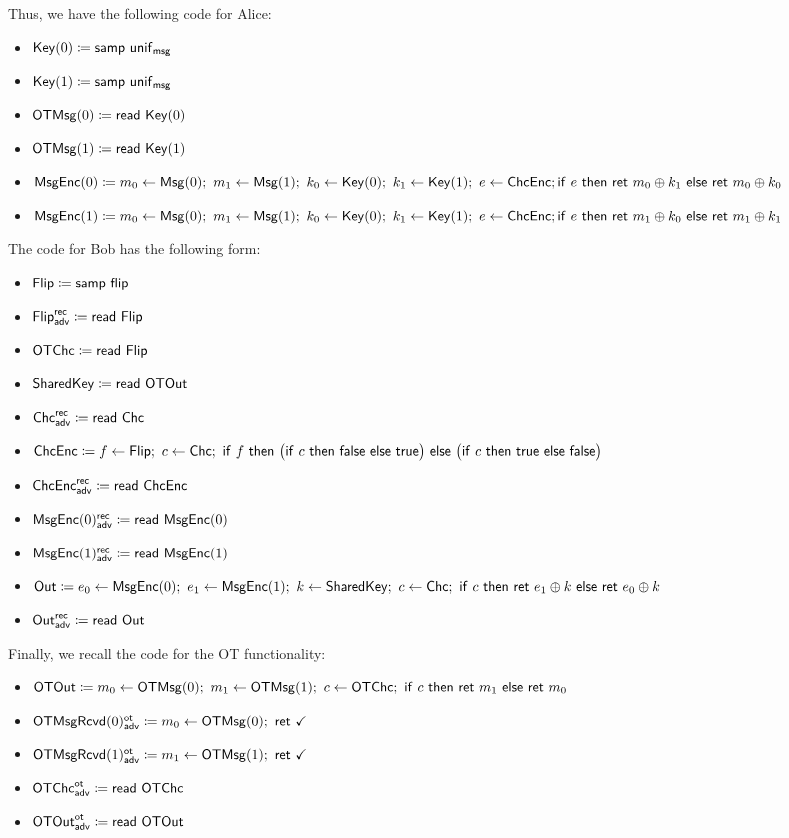 Thus, we have the following code for Alice:
\begin{itemize}
\item $\mathsf{Key}(0) \coloneqq \mathsf{samp} \ \mathsf{unif}_{\mathsf{msg}}$
\item $\mathsf{Key}(1) \coloneqq \mathsf{samp} \ \mathsf{unif}_{\mathsf{msg}}$
\item $\mathsf{OTMsg}(0) \coloneqq \mathsf{read} \ \mathsf{Key}(0)$
\item $\mathsf{OTMsg}(1) \coloneqq \mathsf{read} \ \mathsf{Key}(1)$
\item $\mathsf{MsgEnc}(0) \coloneqq m_0 \leftarrow \mathsf{Msg}(0); \ m_1 \leftarrow \mathsf{Msg}(1); \ k_0 \leftarrow \mathsf{Key}(0); \ k_1 \leftarrow \mathsf{Key}(1); \ e \leftarrow \mathsf{ChcEnc}; \\ \mathsf{if} \ e \ \mathsf{then} \ \mathsf{ret} \ m_0 \oplus k_1 \ \mathsf{else} \ \mathsf{ret} \ m_0 \oplus k_0$
\item $\mathsf{MsgEnc}(1) \coloneqq m_0 \leftarrow \mathsf{Msg}(0); \ m_1 \leftarrow \mathsf{Msg}(1); \ k_0 \leftarrow \mathsf{Key}(0); \ k_1 \leftarrow \mathsf{Key}(1); \ e \leftarrow \mathsf{ChcEnc}; \\ \mathsf{if} \ e \ \mathsf{then} \ \mathsf{ret} \ m_1 \oplus k_0 \ \mathsf{else} \ \mathsf{ret} \ m_1 \oplus k_1$
\end{itemize}
The code for Bob has the following form:
\begin{itemize}
\item $\mathsf{Flip} \coloneqq \mathsf{samp} \ \mathsf{flip}$
\item {\color{blue} $\mathsf{Flip}^{\mathsf{rec}}_{\mathsf{adv}} \coloneqq \mathsf{read} \ \mathsf{Flip}$}
\item $\mathsf{OTChc} \coloneqq \mathsf{read} \ \mathsf{Flip}$
\item $\mathsf{SharedKey} \coloneqq \mathsf{read} \ \mathsf{OTOut}$
\item {\color{blue} $\mathsf{Chc}^{\mathsf{rec}}_{\mathsf{adv}} \coloneqq \mathsf{read} \ \mathsf{Chc}$}
\item $\ChcEnc \coloneqq f \leftarrow \Flip; \ c \leftarrow \Chc; \ \ifte{f}{\big(\ifte{c}{\false}{\true}\big)}{\big(\ifte{c}{\true}{\false}\big)}$
\item {\color{blue} $\mathsf{ChcEnc}^{\mathsf{rec}}_{\mathsf{adv}} \coloneqq \mathsf{read} \ \mathsf{ChcEnc}$}
\item {\color{blue} $\mathsf{MsgEnc}(0)^{\mathsf{rec}}_{\mathsf{adv}} \coloneqq \mathsf{read} \ \mathsf{MsgEnc}(0)$}
\item {\color{blue} $\mathsf{MsgEnc}(1)^{\mathsf{rec}}_{\mathsf{adv}} \coloneqq \mathsf{read} \ \mathsf{MsgEnc}(1)$}
\item $\mathsf{Out} \coloneqq e_0 \leftarrow \mathsf{MsgEnc}(0); \ e_1 \leftarrow \mathsf{MsgEnc}(1); \ k \leftarrow \mathsf{SharedKey}; \ c \leftarrow \mathsf{Chc}; \ \mathsf{if} \ c \ \mathsf{then} \ \mathsf{ret} \ e_1 \oplus k \ \mathsf{else} \ \mathsf{ret} \ e_0 \oplus k$
\item {\color{blue} $\mathsf{Out}^{\mathsf{rec}}_{\mathsf{adv}} \coloneqq \mathsf{read} \ \mathsf{Out}$}
\end{itemize}
Finally, we recall the code for the OT functionality:
\begin{itemize}
\item $\OTOut \coloneqq m_0 \leftarrow \OTMsg(0); \ m_1 \leftarrow \OTMsg(1); \ c \leftarrow \OTChc; \ \ifte{c}{\ret{m_1}}{\ret{m_0}}$
\item {\color{blue} $\LeakOTMsgRcvd(0)^\ot_\adv \coloneqq m_0 \leftarrow \OTMsg(0); \ \ret{\checkmark}$}
\item {\color{blue} $\LeakOTMsgRcvd(1)^\ot_\adv \coloneqq m_1 \leftarrow \OTMsg(1); \ \ret{\checkmark}$}
\item {\color{blue} $\mathsf{OTChc}^{\mathsf{ot}}_{\mathsf{adv}} \coloneqq \mathsf{read} \ \mathsf{OTChc}$}
\item {\color{blue} $\mathsf{OTOut}^{\mathsf{ot}}_{\mathsf{adv}} \coloneqq \mathsf{read} \ \mathsf{OTOut}$}
\end{itemize}
